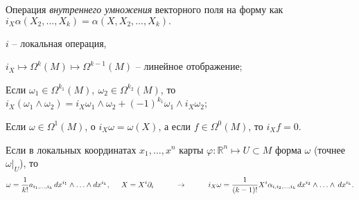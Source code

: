 \begin{to_def} 
    Операция \textit{внутреннего умножения} векторного поля на форму как
    $ i_X \alpha(X_2, \ldots, X_k) = \alpha(X, X_2, \ldots, X_k).$
\end{to_def}

\begin{enumerate*}
    \item $i$ -- локальная операция,
    \item $i_X \mapsto \Omega^k (M) \mapsto \Omega^{k-1}(M)$ -- линейное отображение;
    \item Если $\omega_1 \in \Omega^{k_1}(M), \ \omega_2 \in \Omega^{k_2}(M)$, то $i_X(\omega_1 \wedge \omega_2) = i_X \omega_1 \wedge \omega_2 + (-1)^{k_1} \omega_1 \wedge i_X \omega_2$;
    \item Если $\omega \in \Omega^1 (M)$, о $i_X \omega = \omega(X)$, а если $f \in \Omega^0 (M)$, то $i_X f = 0$.
\end{enumerate*}

\begin{to_lem} 
     Если в локальных координатах $x_1,\ldots,x^n$ карты $\varphi \colon \mathbb{R}^n \mapsto U \subset M$ форма $\omega$ (точнее $\omega|_U$), то
\begin{equation*}
\omega = \frac{1}{k!} a_{i_1,\ldots,i_k}\, d x^{i_1}\wedge\ldots \wedge d x^{i_k},
\hspace{0.5cm} 
X = X^i \partial_i
\hspace{1cm} \to \hspace{1cm} 
    i_X \omega = \frac{1}{(k-1)!}  X^i \alpha_{i,i_2,\ldots,i_k} \, d x^{i_2} \wedge \ldots \wedge \, d x^{i_k}.
\end{equation*}
\end{to_lem}
